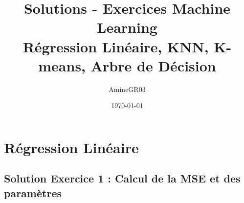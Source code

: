 \documentclass[11pt,a4paper]{article}
\title{Solutions - Exercices Machine Learning\\
\large Régression Linéaire, KNN, K-means, Arbre de Décision}
\author{AmineGR03}
\date{\today}
\begin{document}
\maketitle

\tableofcontents
\newpage


\section{Régression Linéaire}

\subsection{Solution Exercice 1 : Calcul de la MSE et des paramètres}
\end{document}
